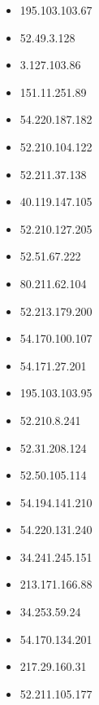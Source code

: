 \documentclass{article}
\begin{document}
\begin{itemize}
            \item 195.103.103.67
        
            \item 52.49.3.128
        
            \item 3.127.103.86
        
            \item 151.11.251.89
        
            \item 54.220.187.182
        
            \item 52.210.104.122
        
            \item 52.211.37.138
        
            \item 40.119.147.105
        
            \item 52.210.127.205
        
            \item 52.51.67.222
        
            \item 80.211.62.104
        
            \item 52.213.179.200
        
            \item 54.170.100.107
        
            \item 54.171.27.201
        
            \item 195.103.103.95
        
            \item 52.210.8.241
        
            \item 52.31.208.124
        
            \item 52.50.105.114
        
            \item 54.194.141.210
        
            \item 54.220.131.240
        
            \item 34.241.245.151
        
            \item 213.171.166.88
        
            \item 34.253.59.24
        
            \item 54.170.134.201
        
            \item 217.29.160.31
        
            \item 52.211.105.177
        
    
\end{itemize}
\end{document}
